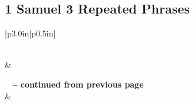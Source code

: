 \subsection{1 Samuel 3 Repeated Phrases}


\normalsize
 
\begin{center}
\begin{longtable}{|p{3.0in}|p{0.5in}|}
\caption[1 Samuel 3 Repeated Phrases]{1 Samuel 3 Repeated Phrases}\label{table:Repeated Phrases 1 Samuel 3} \\
\hline {} &  \\ \hline 
\endfirsthead
 
{{\bfseries \tablename\ \thetable{} -- continued from previous page}} \\  
\hline {} &  \\ \hline 
\endhead
 

\end{longtable}
\end{center}
